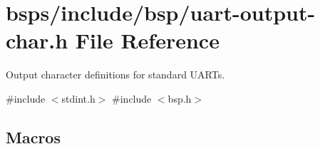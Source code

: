 \hypertarget{uart-output-char_8h}{}\section{bsps/include/bsp/uart-\/output-\/char.h File Reference}
\label{uart-output-char_8h}


Output character definitions for standard U\+A\+R\+Ts.  


{\ttfamily \#include $<$stdint.\+h$>$}\newline
{\ttfamily \#include $<$bsp.\+h$>$}\newline
\subsection*{Macros}
